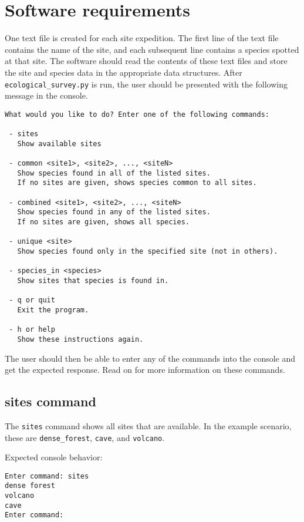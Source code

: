 \documentclass[12pt,letterpaper]{article}
\begin{document}
\section{Software requirements}
One text file is created for each site expedition. The first line of the text file contains the name of the site, and each subsequent line contains a species spotted at that site. The software should read the contents of these text files and store the site and species data in the appropriate data structures. After \texttt{ecological\_survey.py} is run, the user should be presented with the following message in the console.

\begin{lstlisting}
What would you like to do? Enter one of the following commands:

 - sites
   Show available sites

 - common <site1>, <site2>, ..., <siteN>  
   Show species found in all of the listed sites.  
   If no sites are given, shows species common to all sites.

 - combined <site1>, <site2>, ..., <siteN>  
   Show species found in any of the listed sites.  
   If no sites are given, shows all species.

 - unique <site>  
   Show species found only in the specified site (not in others).

 - species_in <species>
   Show sites that species is found in.

 - q or quit  
   Exit the program.

 - h or help  
   Show these instructions again.

\end{lstlisting}

The user should then be able to enter any of the commands into the console and get the expected response. Read on for more information on these commands.

\subsection{sites command}
The \texttt{sites} command shows all sites that are available. In the example scenario, these are \texttt{dense\_forest}, \texttt{cave}, and \texttt{volcano}.

Expected console behavior:
\begin{lstlisting}
Enter command: sites
dense forest
volcano
cave
Enter command: 
\end{lstlisting}
\end{document}

